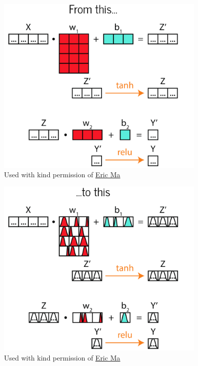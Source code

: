 \documentclass{beamer}
\newcommand{\mdlink}[2]{\href{#2}{\underline{#1}}}
\begin{document}
\begin{frame}
	\begin{figure}
		\centering
		\includegraphics[width = 0.9\textwidth]{im/going_bayesian1.png}
		\caption{Used with kind permission of \mdlink{Eric Ma}{https://ericmjl.github.io/}}
	\end{figure}
\end{frame}

\begin{frame}
	\begin{figure}
		\centering
		\includegraphics[width = 0.9\textwidth]{im/going_bayesian2.png}
		\caption{Used with kind permission of \mdlink{Eric Ma}{https://ericmjl.github.io/}}
	\end{figure}
\end{frame}
\end{document}

